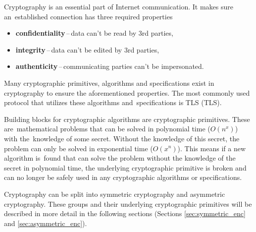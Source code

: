 Cryptography is an essential part of Internet communication. It makes sure an~established connection has three required properties \cite{Bernstein149}
\begin{itemize}
  \item \textbf{confidentiality}\,--\,data can't be read by 3rd parties,
  \item \textbf{integrity}\,--\,data can't be edited by 3rd parties,
  \item \textbf{authenticity}\,--\,communicating parties can't be impersonated.
\end{itemize}
Many cryptographic primitives, algorithms and specifications exist in cryptography to ensure the aforementioned properties. The most commonly used protocol that utilizes these algorithms and~specifications is TLS (\acl{TLS}).

Building blocks for cryptographic algorithms are cryptographic primitives. These are~mathematical problems that can be solved in polynomial time ($O(n^x)$) with the~knowledge of some secret. Without the knowledge of this secret, the problem can only be solved in exponential time ($O(x^n)$). This means if a new algorithm is~found that can solve the problem without the knowledge of the secret in polynomial time, the underlying cryptographic primitive is broken and can no longer be safely used in any cryptographic algorithms or specifications.\cite{Smart2004}

Cryptography can be split into symmetric cryptography and asymmetric cryptography. These groups and their underlying cryptographic primitives will be described in more detail in the following sections (Sections \ref{sec:symmetric_enc} and \ref{sec:asymmetric_enc}).
